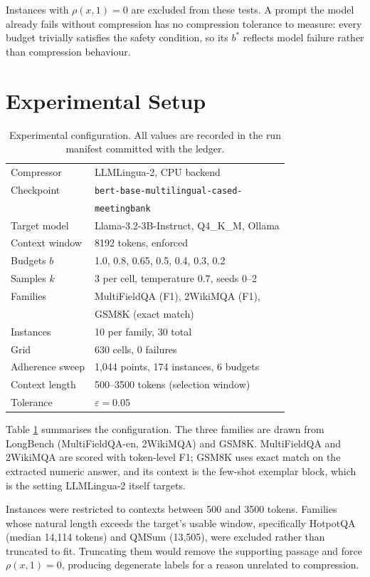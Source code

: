 \documentclass[conference]{IEEEtran}
\begin{document}
Instances with $\rho(x,1) = 0$ are excluded from these tests. A prompt the
model already fails without compression has no compression tolerance to
measure: every budget trivially satisfies the safety condition, so its $b^{*}$
reflects model failure rather than compression behaviour.

\section{Experimental Setup}

\begin{table}[t]
\caption{Experimental configuration. All values are recorded in the run
manifest committed with the ledger.}
\label{tab:setup}
\centering
\small
\begin{tabular}{ll}
\toprule
Compressor & LLMLingua-2, CPU backend \\
Checkpoint & {\footnotesize\texttt{bert-base-multilingual-cased-}} \\
 & {\footnotesize\texttt{meetingbank}} \\
Target model & Llama-3.2-3B-Instruct, Q4\_K\_M, Ollama \\
Context window & 8192 tokens, enforced \\
Budgets $b$ & 1.0, 0.8, 0.65, 0.5, 0.4, 0.3, 0.2 \\
Samples $k$ & 3 per cell, temperature 0.7, seeds 0--2 \\
Families & MultiFieldQA (F1), 2WikiMQA (F1), \\
 & GSM8K (exact match) \\
Instances & 10 per family, 30 total \\
Grid & 630 cells, 0 failures \\
Adherence sweep & 1{,}044 points, 174 instances, 6 budgets \\
Context length & 500--3500 tokens (selection window) \\
Tolerance & $\varepsilon = 0.05$ \\
\bottomrule
\end{tabular}
\end{table}

Table \ref{tab:setup} summarises the configuration. The three families are
drawn from LongBench (MultiFieldQA-en, 2WikiMQA) and GSM8K. MultiFieldQA and
2WikiMQA are scored with token-level F1; GSM8K uses exact match on the
extracted numeric answer, and its context is the few-shot exemplar block,
which is the setting LLMLingua-2 itself targets.

Instances were restricted to contexts between 500 and 3500 tokens. Families
whose natural length exceeds the target's usable window, specifically HotpotQA
(median 14{,}114 tokens) and QMSum (13{,}505), were excluded rather than
truncated to fit. Truncating them would remove the supporting passage and
force $\rho(x,1) = 0$, producing degenerate labels for a reason unrelated to
compression.
\end{document}
